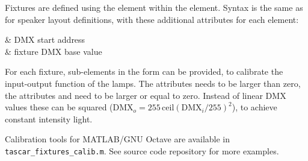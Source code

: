 Fixtures are defined using the  element within the
 element.
%
Syntax is the same as for speaker layout definitions, with these
additional attributes for each element:
\begin{tscattributes}
   & DMX start address      \\
 & fixture DMX base value \\
\end{tscattributes}
For each fixture, sub-elements in the form  can be provided, to calibrate the input-output
function of the lamps. The attributes  needs to be larger
than zero, the attributes  and  need to be
larger or equal to zero.
%
Instead of linear DMX values these can be squared ($\textrm{DMX}_o=255\,\textrm{ceil}(\textrm{DMX}_i/255)^2$), to achieve constant intensity light.

Calibration tools for MATLAB/GNU Octave are available
in \verb!tascar_fixtures_calib.m!. See source code repository for more
examples.

